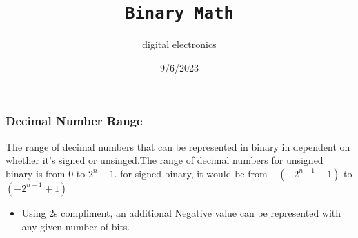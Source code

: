 \documentclass[a4paper,12pt]{article}
\title{\texttt{Binary Math}\\\hrulefill}
\author{digital electronics}
\date{\small{9/6/2023}}
\begin{document}
    \maketitle

    \subsubsection*{Decimal Number Range}
        The range of decimal numbers that can be represented in binary in dependent on whether it's signed or unsinged.The range of decimal numbers for unsigned binary is from 0 to $2^n-1$. for signed binary, it would be from $-(-2^{n-1} + 1)$ to $(-2^{n-1} + 1)$
        \begin{itemize}
            \item Using 2s compliment, an additional Negative value can be represented with any given number of bits.
        \end{itemize}
\end{document}
